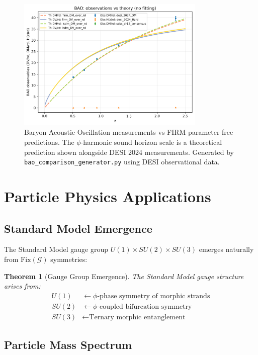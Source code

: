 \documentclass[12pt]{article}
\newcommand{\G}{\mathcal{G}}                %
\newcommand{\Fix}{\text{Fix}}               %
\newtheorem{theorem}{Theorem}
\begin{document}
\begin{figure}[H]
    \centering
    \includegraphics[width=0.8\textwidth]{figures/bao_comparison.png}
    \caption{Baryon Acoustic Oscillation measurements vs FIRM parameter-free predictions. The $\phi$-harmonic sound horizon scale is a theoretical prediction shown alongside DESI 2024 measurements. Generated by \texttt{bao\_comparison\_generator.py} using DESI observational data.}
    \label{fig:bao_comparison}
\end{figure}

\section{Particle Physics Applications}

\subsection{Standard Model Emergence}

The Standard Model gauge group $U(1) \times SU(2) \times SU(3)$ emerges naturally from $\Fix(\G)$ symmetries:

\begin{theorem}[Gauge Group Emergence]
\label{thm:gauge_groups}
The Standard Model gauge structure arises from:
\begin{align}
U(1) &\leftarrow \text{$\phi$-phase symmetry of morphic strands} \\
SU(2) &\leftarrow \text{$\phi$-coupled bifurcation symmetry} \\  
SU(3) &\leftarrow \text{Ternary morphic entanglement}
\end{align}
\end{theorem}

\subsection{Particle Mass Spectrum}
\end{document}
